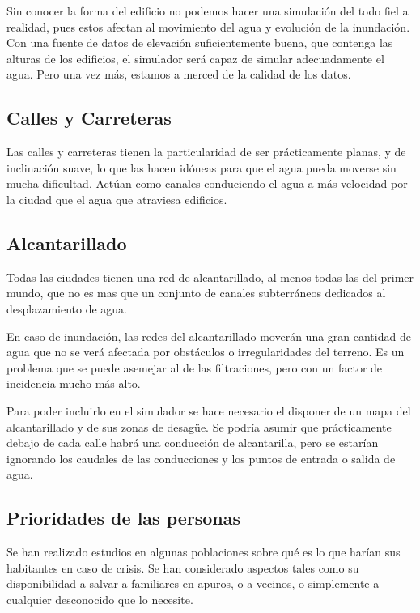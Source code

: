 Sin conocer la forma del edificio no podemos hacer una simulación del todo fiel
a realidad, pues estos afectan al movimiento del agua y evolución de la
inundación. Con una fuente de datos de elevación suficientemente buena, que
contenga las alturas de los edificios, el simulador será capaz de simular
adecuadamente el agua. Pero una vez más, estamos a merced de la calidad de los
datos.

\subsection*{Calles y Carreteras}

Las calles y carreteras tienen la particularidad de ser prácticamente planas, y
de inclinación suave, lo que las hacen idóneas para que el agua pueda moverse
sin mucha dificultad. Actúan como canales conduciendo el agua a más velocidad
por la ciudad que el agua que atraviesa edificios.

\subsection*{Alcantarillado}

Todas las ciudades tienen una red de alcantarillado, al menos todas las del
primer mundo, que no es mas que un conjunto de canales subterráneos dedicados
al desplazamiento de agua.

En caso de inundación, las redes del alcantarillado moverán una gran cantidad de
agua que no se verá afectada por obstáculos o irregularidades del terreno. Es un
problema que se puede asemejar al de las filtraciones, pero con un factor de
incidencia mucho más alto.

Para poder incluirlo en el simulador se hace necesario el disponer de un mapa
del alcantarillado y de sus zonas de desagüe. Se podría asumir que prácticamente
debajo de cada calle habrá una conducción de alcantarilla, pero se estarían
ignorando los caudales de las conducciones y los puntos de entrada o salida de
agua.

\subsection*{Prioridades de las personas}

Se han realizado estudios\cite{Liu07} en algunas poblaciones sobre qué es
lo que harían sus habitantes en caso de crisis. Se han considerado aspectos
tales como su disponibilidad a salvar a familiares en apuros, o a vecinos, o
simplemente a cualquier desconocido que lo necesite.

